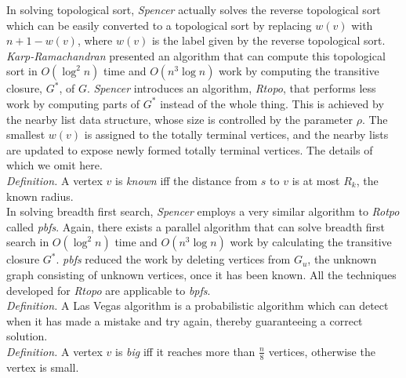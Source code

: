 \documentclass[paper=a4, fontsize=11pt]{scrartcl} %
\numberwithin{equation}{section} %
\numberwithin{figure}{section} %
\numberwithin{table}{section} %
\begin{document}
In solving topological sort, \textit{Spencer\cite{S97}} actually solves the reverse topological sort which can be easily converted to a topological sort by replacing $w(v)$ with $n + 1 - w(v)$, where $w(v)$ is the label given by the reverse topological sort. \textit{Karp-Ramachandran\cite{KR90}} presented an algorithm that can compute this topological sort in $O(\log^2{n})$ time and $O(n^3\log{n})$ work by computing the transitive closure, $G^*$, of $G$. \textit{Spencer\cite{S97}} introduces an algorithm, \textit{Rtopo}, that performs less work by computing parts of $G^*$ instead of the whole thing. This is achieved by the nearby list data structure, whose size is controlled by the parameter $\rho$. The smallest $w(v)$ is assigned to the totally terminal vertices, and the nearby lists are updated to expose newly formed totally terminal vertices. The details of which we omit here.\\   

\textit{Definition.} A vertex $v$ is \textit{known} iff the distance from $s$ to $v$ is at most $R_k$, the known radius.\\

In solving breadth first search, \textit{Spencer\cite{S97}} employs a very similar algorithm to \textit{Rotpo} called \textit{pbfs}. Again, there exists a parallel algorithm that can solve breadth first search in $O(\log^2{n})$ time and $O(n^3\log{n})$ work by calculating the transitive closure $G^*$. \textit{pbfs} reduced the work by deleting vertices from $G_u$, the unknown graph consisting of unknown vertices, once it has been known. All the techniques developed for \textit{Rtopo} are applicable to \textit{bpfs}. \\ 

\textit{Definition.} A Las Vegas algorithm is a probabilistic algorithm which can detect when it has made a mistake and try again, thereby guaranteeing a correct solution.\\ 

\textit{Definition.} A vertex $v$ is \textit{big} iff it reaches more than \textit{$\frac{n}{8}$} vertices, otherwise the vertex is small.\\ 
\end{document}
